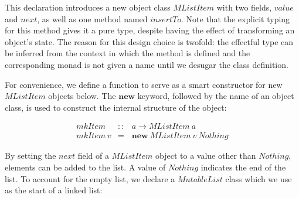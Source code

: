\documentclass[runningheads,a4paper]{llncs}
\begin{document}
This declaration introduces a new object class $\mathit{MListItem}$ with two fields, $\mathit{value}$ and $\mathit{next}$, as well as one method named $\mathit{insertTo}$. Note that the explicit typing for this method gives it a pure type, despite having the effect of transforming an object's state. The reason for this design choice is twofold: the effectful type can be inferred from the context in which the method is defined and the corresponding monad is not given a name until we desugar the class definition. %

For convenience, we define a function to serve as a smart constructor for new $\mathit{MListItem}$ objects below. The $\mathbf{new}$ keyword, followed by the name of an object class, is used to construct the internal structure of the object:

\begin{displaymath}
\begin{array}{lcl}
\mathit{mkItem} & :: & a \to \mathit{MListItem}~a \\
\mathit{mkItem}~v & = & \mathbf{new}~\mathit{MListItem}~v~\mathit{Nothing}
\end{array}
\end{displaymath}

By setting the $\mathit{next}$ field of a $\mathit{MListItem}$ object to a value other than $\mathit{Nothing}$, elements can be added to the list. A value of $\mathit{Nothing}$ indicates the end of the list. To account for the empty list, we declare a $\mathit{MutableList}$ class which we use as the start of a linked list:
\end{document}
